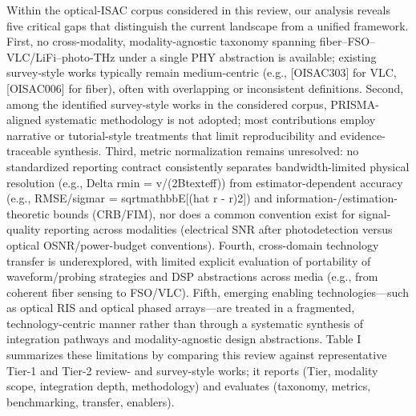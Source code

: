 {} Within the optical-ISAC corpus considered in this review, our analysis reveals five critical gaps that distinguish the current landscape from a unified framework. First, no cross-modality, modality-agnostic taxonomy spanning fiber–FSO–VLC/LiFi–photo-THz under a single PHY abstraction is available; existing survey-style works typically remain medium-centric (e.g., [O\markdownRendererUnderscore{}ISAC\markdownRendererUnderscore{}303] for VLC, [O\markdownRendererUnderscore{}ISAC\markdownRendererUnderscore{}006] for fiber), often with overlapping or inconsistent definitions. Second, among the identified survey-style works in the considered corpus, PRISMA-aligned systematic methodology is not adopted; most contributions employ narrative or tutorial-style treatments that limit reproducibility and evidence-traceable synthesis. Third, metric normalization remains unresolved: no standardized reporting contract consistently separates bandwidth-limited physical resolution (e.g., \markdownRendererDollarSign{}\markdownRendererBackslash{}Delta r\markdownRendererUnderscore{}\markdownRendererLeftBrace{}\markdownRendererBackslash{}min\markdownRendererRightBrace{} = v/(2B\markdownRendererUnderscore{}\markdownRendererLeftBrace{}\markdownRendererBackslash{}text\markdownRendererLeftBrace{}eff\markdownRendererRightBrace{}\markdownRendererRightBrace{})\markdownRendererDollarSign{}) from estimator-dependent accuracy (e.g., RMSE/\markdownRendererDollarSign{}\markdownRendererBackslash{}sigma\markdownRendererUnderscore{}r = \markdownRendererBackslash{}sqrt\markdownRendererLeftBrace{}\markdownRendererBackslash{}mathbb\markdownRendererLeftBrace{}E\markdownRendererRightBrace{}[(\markdownRendererBackslash{}hat r - r)\markdownRendererCircumflex{}2]\markdownRendererRightBrace{}\markdownRendererDollarSign{}) and information-/estimation-theoretic bounds (CRB/FIM), nor does a common convention exist for signal-quality reporting across modalities (electrical SNR after photodetection versus optical OSNR/power-budget conventions). Fourth, cross-domain technology transfer is underexplored, with limited explicit evaluation of portability of waveform/probing strategies and DSP abstractions across media (e.g., from coherent fiber sensing to FSO/VLC). Fifth, emerging enabling technologies—such as optical RIS and optical phased arrays—are treated in a fragmented, technology-centric manner rather than through a systematic synthesis of integration pathways and modality-agnostic design abstractions. Table I summarizes these limitations by comparing this review against representative Tier-1 and Tier-2 review- and survey-style works; it reports  (Tier, modality scope, integration depth, methodology) and evaluates  (taxonomy, metrics, benchmarking, transfer, enablers).\markdownRendererParagraphSeparator
